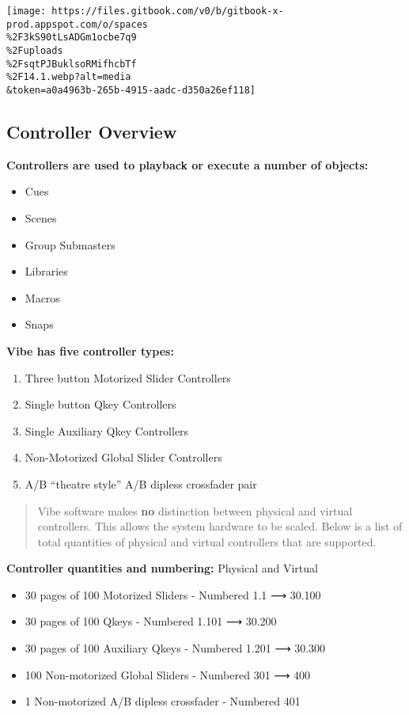 \documentclass[
]{article}
\begin{document}
\texttt{[image: https://files.gitbook.com/v0/b/gitbook-x-prod.appspot.com/o/spaces\\\%2F3kS90tLsADGm1ocbe7q9\\\%2Fuploads\\\%2FsqtPJBuklsoRMifhcbTf\\\%2F14.1.webp?alt=media\\\&token=a0a4963b-265b-4915-aadc-d350a26ef118]}

\hypertarget{controller-overview}{%
\subsection{Controller Overview}\label{controller-overview}}

\textbf{Controllers are used to playback or execute a number of objects:}

\begin{itemize}
\item
  Cues
\item
  Scenes
\item
  Group Submasters
\item
  Libraries
\item
  {Macros}
\item
  {Snaps }
\end{itemize}

\textbf{Vibe has five controller types:}

\begin{enumerate}
\def\labelenumi{\arabic{enumi}.}
\item
  Three button Motorized Slider Controllers
\item
  Single button Qkey Controllers
\item
  Single Auxiliary Qkey Controllers
\item
  Non-Motorized Global Slider Controllers
\item
  A/B ``theatre style'' A/B dipless crossfader pair
\end{enumerate}

\begin{quote}
Vibe software makes \textbf{no} distinction between physical and virtual controllers. This allows the system hardware to be scaled. Below is a list of total quantities of physical and virtual controllers that are supported.
\end{quote}

\textbf{Controller quantities and numbering:} Physical and Virtual

\begin{itemize}
\item
  30 pages of 100 Motorized Sliders - Numbered 1.1 ⟶ 30.100
\item
  30 pages of 100 Qkeys - Numbered 1.101 ⟶ 30.200
\item
  30 pages of 100 Auxiliary Qkeys - Numbered 1.201 ⟶ 30.300
\item
  100 Non-motorized Global Sliders - Numbered 301 ⟶ 400
\item
  1 Non-motorized A/B dipless crossfader - Numbered 401
\end{itemize}
\end{document}
